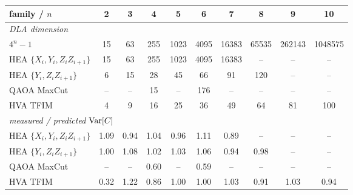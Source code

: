 \begin{tabular}{lccccccccc}
\toprule
family / $n$ & 2 & 3 & 4 & 5 & 6 & 7 & 8 & 9 & 10 \\
\midrule
\multicolumn{10}{l}{\emph{DLA dimension}} \\
\quad $4^n-1$ & 15 & 63 & 255 & 1023 & 4095 & 16383 & 65535 & 262143 & 1048575 \\
\quad HEA $\{X_i,Y_i,Z_iZ_{i+1}\}$ & 15 & 63 & 255 & 1023 & 4095 & 16383 & -- & -- & -- \\
\quad HEA $\{Y_i,Z_iZ_{i+1}\}$ & 6 & 15 & 28 & 45 & 66 & 91 & 120 & -- & -- \\
\quad QAOA MaxCut & -- & -- & 15 & -- & 176 & -- & -- & -- & -- \\
\quad HVA TFIM & 4 & 9 & 16 & 25 & 36 & 49 & 64 & 81 & 100 \\
\midrule
\multicolumn{10}{l}{\emph{measured / predicted $\mathrm{Var}[C]$}} \\
\quad HEA $\{X_i,Y_i,Z_iZ_{i+1}\}$ & 1.09 & 0.94 & 1.04 & 0.96 & 1.11 & 0.89 & -- & -- & -- \\
\quad HEA $\{Y_i,Z_iZ_{i+1}\}$ & 1.00 & 1.08 & 1.02 & 1.03 & 1.06 & 0.94 & 0.98 & -- & -- \\
\quad QAOA MaxCut & -- & -- & 0.60 & -- & 0.59 & -- & -- & -- & -- \\
\quad HVA TFIM & 0.32 & 1.22 & 0.86 & 1.00 & 1.00 & 1.03 & 0.91 & 1.03 & 0.94 \\
\bottomrule
\end{tabular}
